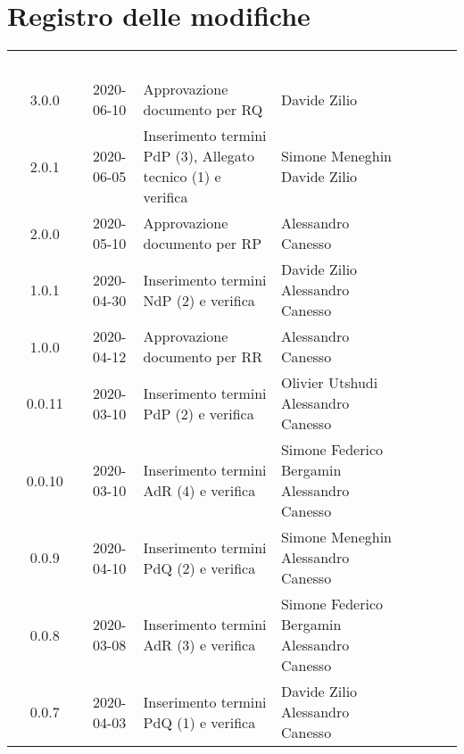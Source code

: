 \section*{Registro delle modifiche}
{
	\centering
	\begin{longtable}{ c c  C{4cm} C{3cm} C{3.5cm} }
		\textcolor{white}{\textbf{Versione}} & \textcolor{white}{\textbf{Data}} & \textcolor{white}{\textbf{Descrizione}} & \textcolor{white}{\textbf{Nominativo}} & \textcolor{white}{\textbf{Ruolo}}\\	
		3.0.0 & 2020-06-10 & Approvazione documento per RQ & Davide Zilio &\RdP{}\\	
		2.0.1 & 2020-06-05 & Inserimento termini PdP (3), Allegato tecnico (1) e verifica & Simone Meneghin \newline Davide Zilio  &\ana{} \newline \ver{} \\
		2.0.0 & 2020-05-10 & Approvazione documento per RP & Alessandro Canesso &\RdP{}\\
		1.0.1 & 2020-04-30 & Inserimento termini NdP (2) e verifica & Davide Zilio \newline Alessandro Canesso &\ana{} \newline \ver{} \\
		1.0.0 & 2020-04-12 & Approvazione documento per RR& Alessandro Canesso &\RdP{}\\
		0.0.11 & 2020-03-10 & Inserimento termini PdP (2) e verifica & Olivier Utshudi \newline Alessandro Canesso &\ana{} \newline \ver{} \\
		0.0.10 & 2020-03-10 & Inserimento termini AdR (4) e verifica & Simone Federico Bergamin \newline Alessandro Canesso &\ana{} \newline \ver{} \\
		0.0.9 & 2020-04-10 & Inserimento termini PdQ (2) e verifica & Simone Meneghin \newline Alessandro Canesso &\ana{} \newline \ver{} \\
		0.0.8 & 2020-03-08 & Inserimento termini AdR (3) e verifica & Simone Federico Bergamin \newline Alessandro Canesso &\ana{} \newline \ver{} \\
		0.0.7 & 2020-04-03 & Inserimento termini PdQ (1) e verifica & Davide Zilio \newline Alessandro Canesso &\ana{} \newline \ver{} \\

\end{longtable}}
